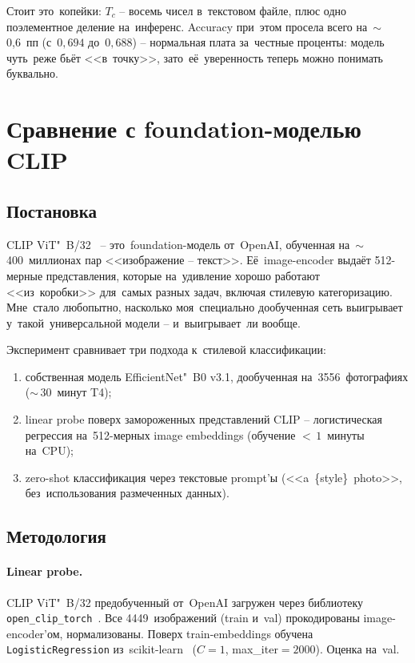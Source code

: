\documentclass[a4paper,12pt]{diplom}
\begin{document}
Стоит это~копейки: $T_c$ -- восемь чисел в~текстовом файле, плюс одно поэлементное деление на~инференс. Accuracy при~этом просела всего на~$\sim$\,0{,}6~пп (с~$0{,}694$ до~$0{,}688$) -- нормальная плата за~честные проценты: модель чуть~реже бьёт <<в~точку>>, зато~её~уверенность теперь можно понимать буквально.

\section{Сравнение с foundation-моделью CLIP}
\label{sec:clip}

\subsection{Постановка}

CLIP ViT"~B/32~\cite{Radford:2021} -- это~foundation-модель от~OpenAI, обученная на~$\sim$\,400~миллионах пар <<изображение -- текст>>. Её~image-encoder выдаёт 512-мерные представления, которые на~удивление хорошо работают <<из~коробки>> для~самых разных задач, включая стилевую категоризацию. Мне~стало любопытно, насколько моя~специально дообученная сеть выигрывает у~такой~универсальной модели -- и~выигрывает~ли вообще.

Эксперимент сравнивает три подхода к~стилевой классификации:
\begin{enumerate}[label=\arabic{enumi})]
\item собственная модель EfficientNet"~B0 v3.1, дообученная на~3556~фотографиях ($\sim$\,30~минут T4);
\item linear probe поверх замороженных представлений CLIP -- логистическая регрессия на~512-мерных image embeddings (обучение $<\,1$~минуты на~CPU);
\item zero-shot классификация через текстовые prompt'ы (<<a~\{style\}~photo>>, без~использования размеченных данных).
\end{enumerate}

\subsection{Методология}

\paragraph{Linear probe.} CLIP ViT"~B/32 предобученный от~OpenAI загружен через библиотеку \texttt{open\_clip\_torch}~\cite{OpenCLIP}. Все 4449~изображений (train и~val) прокодированы image-encoder'ом, нормализованы. Поверх train-embeddings обучена \texttt{LogisticRegression} из~scikit-learn~\cite{ScikitLearn} ($C=1$, max\_iter$=2000$). Оценка на~val.
\end{document}
